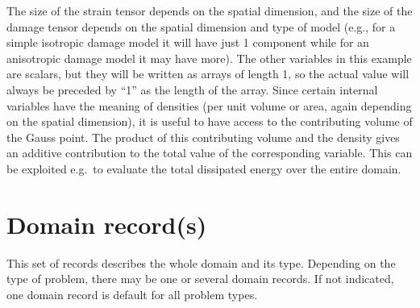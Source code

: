 \documentclass[a4paper]{article}
\begin{document}
\begin{itemize}
The size of the strain tensor depends on the spatial dimension, and the size
of the damage tensor depends on the spatial dimension and type of model
(e.g., for a simple isotropic damage model it will have just 1 component
while for an anisotropic damage model it may have more). The other variables
in this example are scalars, but they will be written as arrays of length 1,
so the actual value will always be preceded by ``1'' as the length of the array. Since certain internal variables have the meaning of densities (per unit volume
or area, again depending on the spatial dimension), it is useful to have
access to the contributing volume  of the Gauss point. The product of this
contributing volume and the density gives an additive contribution to the
total value of the corresponding variable. This can be exploited e.g.\ to
evaluate the total dissipated energy over the entire domain.
\end{itemize}

\section{Domain record(s)}
\label{_DomainRecord}
This set of records describes the whole domain and its type. Depending
on the type of problem, there may be one or several domain records. If not
indicated, one domain record is default for all problem types.
\end{document}
